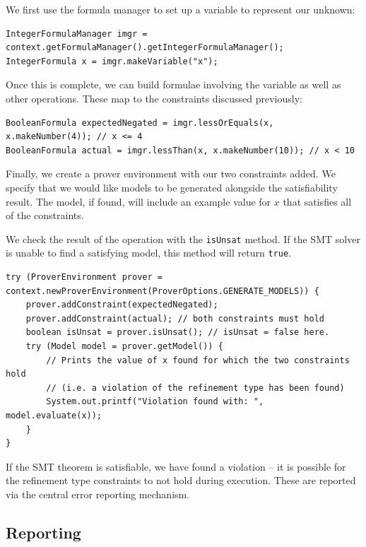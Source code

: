 \documentclass[a4paper]{article}
\begin{document}
    We first use the formula manager to set up a variable to represent our unknown:
    
    \begin{verbatim}
IntegerFormulaManager imgr = context.getFormulaManager().getIntegerFormulaManager();
IntegerFormula x = imgr.makeVariable("x");
\end{verbatim}

Once this is complete, we can build formulae involving the variable as well as other operations. These map to the constraints discussed previously:

\begin{verbatim}
BooleanFormula expectedNegated = imgr.lessOrEquals(x, x.makeNumber(4)); // x <= 4
BooleanFormula actual = imgr.lessThan(x, x.makeNumber(10)); // x < 10
\end{verbatim}

Finally, we create a prover environment with our two constraints added. We specify that we would like models to be generated alongside the satisfiability result. The model, if found, will include an example value for $x$ that satisfies all of the constraints.

We check the result of the operation with the \texttt{isUnsat} method. If the SMT solver is unable to find a satisfying model, this method will return \texttt{true}.

\begin{verbatim}
try (ProverEnvironment prover = context.newProverEnvironment(ProverOptions.GENERATE_MODELS)) {
    prover.addConstraint(expectedNegated);
    prover.addConstraint(actual); // both constraints must hold
    boolean isUnsat = prover.isUnsat(); // isUnsat = false here.
    try (Model model = prover.getModel()) {
        // Prints the value of x found for which the two constraints hold
        // (i.e. a violation of the refinement type has been found)
        System.out.printf("Violation found with: ", model.evaluate(x));
    }
}
    \end{verbatim}
    
    If the SMT theorem is satisfiable, we have found a violation -- it is possible for the refinement type constraints to not hold during execution. These are reported via the central error reporting mechanism.
    
    \subsection*{Reporting}
    
\end{document}
